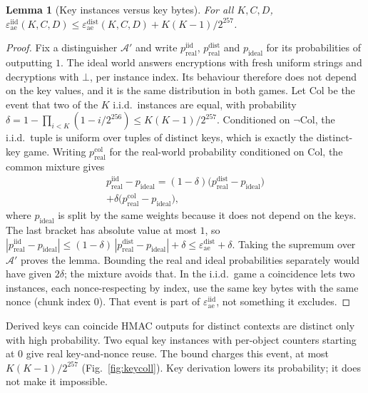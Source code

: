 \documentclass[pdflatex,sn-mathphys-num,twocolumn]{sn-jnl}
\theoremstyle{plain}
\newtheorem{lemma}[theorem]{Lemma}
\theoremstyle{definition}
\begin{document}
\begin{lemma}[Key instances versus key bytes]\label{lem:keycoll}
For all $K,C,D$, $\varepsilon^{\mathrm{iid}}_{\mathrm{ae}}(K,C,D)\le\varepsilon^{\mathrm{dist}}_{\mathrm{ae}}(K,C,D)+K(K-1)/2^{257}$.
\end{lemma}
\begin{proof}
Fix a distinguisher $\mathcal A'$ and write $p^{\mathrm{iid}}_{\mathrm{real}}$, $p^{\mathrm{dist}}_{\mathrm{real}}$ and $p_{\mathrm{ideal}}$ for its probabilities of outputting $1$. The ideal world answers encryptions with fresh uniform strings and decryptions with $\bot$, per instance index. Its behaviour therefore does not depend on the key values, and it is the same distribution in both games. Let $\mathrm{Col}$ be the event that two of the $K$ i.i.d.\ instances are equal, with probability $\delta=1-\prod_{i<K}(1-i/2^{256})\le K(K-1)/2^{257}$. Conditioned on $\neg\mathrm{Col}$, the i.i.d.\ tuple is uniform over tuples of distinct keys, which is exactly the distinct-key game. Writing $p^{\mathrm{col}}_{\mathrm{real}}$ for the real-world probability conditioned on $\mathrm{Col}$, the common mixture gives
\begin{multline*}
 p^{\mathrm{iid}}_{\mathrm{real}}-p_{\mathrm{ideal}}=(1-\delta)\big(p^{\mathrm{dist}}_{\mathrm{real}}-p_{\mathrm{ideal}}\big)\\
 +\delta\big(p^{\mathrm{col}}_{\mathrm{real}}-p_{\mathrm{ideal}}\big),
\end{multline*}
where $p_{\mathrm{ideal}}$ is split by the same weights because it does not depend on the keys. The last bracket has absolute value at most $1$, so $|p^{\mathrm{iid}}_{\mathrm{real}}-p_{\mathrm{ideal}}|\le(1-\delta)\,|p^{\mathrm{dist}}_{\mathrm{real}}-p_{\mathrm{ideal}}|+\delta\le\varepsilon^{\mathrm{dist}}_{\mathrm{ae}}+\delta$. Taking the supremum over $\mathcal A'$ proves the lemma. Bounding the real and ideal probabilities separately would have given $2\delta$; the mixture avoids that. In the i.i.d.\ game a coincidence lets two instances, each nonce-respecting by index, use the same key bytes with the same nonce (chunk index $0$). That event is part of $\varepsilon^{\mathrm{iid}}_{\mathrm{ae}}$, not something it excludes.
\end{proof}

\begin{warnbox}{Derived keys can coincide}
HMAC outputs for distinct contexts are distinct only with high probability. Two equal key instances with per-object counters starting at $0$ give real key-and-nonce reuse. The bound charges this event, at most $K(K-1)/2^{257}$ (Fig.~\ref{fig:keycoll}). Key derivation lowers its probability; it does not make it impossible.
\end{warnbox}
\end{document}
